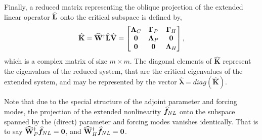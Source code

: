 Finally, a reduced matrix representing the oblique projection of the extended linear operator $\mathbf{\widehat{L}}$ onto the critical subspace is defined by,
\begin{eqnarray}
	\label{eqn:khat}
	\mathbf{\widehat{K}} = \mathbf{\widehat{W}}^{\dagger}\mathbf{\widehat{L}}\mathbf{\widehat{V}} = 
	\begin{bmatrix}
		\mathbf{\Lambda}_{C} & \mathbf{\Gamma}_{P} & \mathbf{\Gamma}_{H} \\ 
		\mathbf{0} &  \mathbf{\Lambda}_{P} & \mathbf{0} \\ 
		\mathbf{0} & \mathbf{0} & \mathbf{\Lambda}_{H}
	\end{bmatrix},
\end{eqnarray}
which is a complex matrix of size $m\times m$. The diagonal elements of $\mathbf{\widehat{K}}$ represent the eigenvalues of the reduced system, that are the critical eigenvalues of the extended system, and may be represented by the vector $\widehat{\boldsymbol{\lambda}} = diag(\mathbf{\widehat{K}})$. 

Note that due to the special structure of the adjoint parameter and forcing modes, the projection of the extended nonlinearity ${\widehat{\boldsymbol{f}}}_{NL}$ onto the subspace spanned by the (direct) parameter and forcing modes vanishes identically. That is to say $\mathbf{\widehat{W}}^{\dagger}_{P}{\widehat{\boldsymbol{f}}}_{NL} = \boldsymbol{0}$, and $\mathbf{\widehat{W}}^{\dagger}_{H}{\widehat{\boldsymbol{f}}}_{NL} = \boldsymbol{0}$. 



















